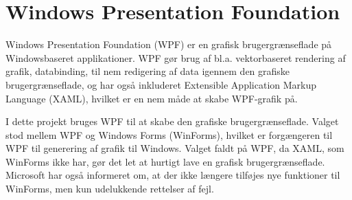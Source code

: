\section{Windows Presentation Foundation}
Windows Presentation Foundation (WPF) er en grafisk brugergrænseflade på Windowsbaseret applikationer. 
WPF gør brug af  bl.a. vektorbaseret rendering af grafik, databinding, til nem redigering af data igennem den grafiske brugergrænseflade, og har også inkluderet Extensible Application Markup Language (XAML), hvilket er en nem måde at skabe WPF-grafik på.\citep{wpf} 

I dette projekt bruges WPF til at skabe den grafiske brugergrænseflade. Valget stod mellem WPF og Windows Forms (WinForms), hvilket er forgængeren til WPF til generering af grafik til Windows. 
Valget faldt på WPF, da XAML, som WinForms ikke har, gør det let at hurtigt lave en grafisk brugergrænseflade. 
Microsoft har også informeret om, at der ikke længere tilføjes nye funktioner til WinForms, men kun udelukkende rettelser af fejl.\citep{winforms}

